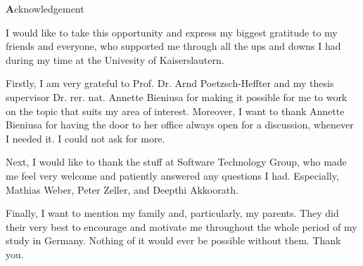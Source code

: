 
\begin{center}
{\Large \textbf Acknowledgement}
\end{center}
\vspace{1cm}

I would like to take this opportunity and express my biggest gratitude to my friends and everyone, who supported me through all the ups and downs I had during my time at the Univesity of Kaiserslautern. 

Firstly, I am very grateful to Prof. Dr. Arnd Poetzsch-Heffter and my thesis supervisor Dr. rer. nat. Annette Bieniusa for making it possible for me to work on the topic that suits my area of interest. Moreover, I want to thank Annette Bieniusa for having the door to her office always open for a discussion, whenever I needed it. I could not ask for more.

Next, I would like to thank the stuff at Software Technology Group, who made me feel very welcome and patiently answered any questions I had. Especially, Mathias Weber, Peter Zeller, and Deepthi Akkoorath.

Finally, I want to mention my family and, particularly, my parents. They did their very best to encourage and motivate me throughout the whole period of my study in Germany. Nothing of it would ever be possible without them. Thank you.